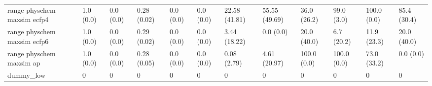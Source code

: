 \begin{tabular}{llllllllllll}
range physchem maxsim ecfp4 & {\cellcolor[HTML]{F6FCFD}} \color[HTML]{000000} 1.0 (0.0) & {\cellcolor[HTML]{F7FCFD}} \color[HTML]{000000} 0.0 (0.0) & {\cellcolor[HTML]{6FC6AA}} \color[HTML]{000000} 0.28 (0.02) & {\cellcolor[HTML]{F7FCFD}} \color[HTML]{000000} 0.0 (0.0) & {\cellcolor[HTML]{F7FCFD}} \color[HTML]{000000} 0.0 (0.0) & {\cellcolor[HTML]{D1EEEA}} \color[HTML]{000000} 22.58 (41.81) & {\cellcolor[HTML]{55B98F}} \color[HTML]{F1F1F1} 55.55 (49.69) & {\cellcolor[HTML]{00441B}} \color[HTML]{F1F1F1} 36.0 (26.2) & {\cellcolor[HTML]{00441B}} \color[HTML]{F1F1F1} 99.0 (3.0) & {\cellcolor[HTML]{28914D}} \color[HTML]{F1F1F1} 100.0 (0.0) & {\cellcolor[HTML]{F7FCFD}} \color[HTML]{000000} 85.4 (30.4) \\
range physchem maxsim ecfp6 & {\cellcolor[HTML]{F6FCFD}} \color[HTML]{000000} 1.0 (0.0) & {\cellcolor[HTML]{F7FCFD}} \color[HTML]{000000} 0.0 (0.0) & {\cellcolor[HTML]{6DC5A9}} \color[HTML]{000000} 0.29 (0.02) & {\cellcolor[HTML]{F7FCFD}} \color[HTML]{000000} 0.0 (0.0) & {\cellcolor[HTML]{F7FCFD}} \color[HTML]{000000} 0.0 (0.0) & {\cellcolor[HTML]{F2FAFC}} \color[HTML]{000000} 3.44 (18.22) & {\cellcolor[HTML]{F7FCFD}} \color[HTML]{000000} 0.0 (0.0) & {\cellcolor[HTML]{00441B}} \color[HTML]{F1F1F1} 20.0 (40.0) & {\cellcolor[HTML]{00441B}} \color[HTML]{F1F1F1} 6.7 (20.2) & {\cellcolor[HTML]{00491D}} \color[HTML]{F1F1F1} 11.9 (23.3) & {\cellcolor[HTML]{F7FCFD}} \color[HTML]{000000} 20.0 (40.0) \\
range physchem maxsim ap & {\cellcolor[HTML]{F6FCFD}} \color[HTML]{000000} 1.0 (0.0) & {\cellcolor[HTML]{F7FCFD}} \color[HTML]{000000} 0.0 (0.0) & {\cellcolor[HTML]{68C3A6}} \color[HTML]{000000} 0.28 (0.05) & {\cellcolor[HTML]{F7FCFD}} \color[HTML]{000000} 0.0 (0.0) & {\cellcolor[HTML]{F7FCFD}} \color[HTML]{000000} 0.0 (0.0) & {\cellcolor[HTML]{F7FCFD}} \color[HTML]{000000} 0.08 (2.79) & {\cellcolor[HTML]{F1FAFC}} \color[HTML]{000000} 4.61 (20.97) & {\cellcolor[HTML]{00441B}} \color[HTML]{F1F1F1} 100.0 (0.0) & {\cellcolor[HTML]{00441B}} \color[HTML]{F1F1F1} 100.0 (0.0) & {\cellcolor[HTML]{0C7735}} \color[HTML]{F1F1F1} 73.0 (33.2) & {\cellcolor[HTML]{F7FCFD}} \color[HTML]{000000} 0.0 (0.0) \\
dummy_low & {\cellcolor[HTML]{F7FCFD}} \color[HTML]{000000} 0 & {\cellcolor[HTML]{F7FCFD}} \color[HTML]{000000} 0 & {\cellcolor[HTML]{F7FCFD}} \color[HTML]{000000} 0 & {\cellcolor[HTML]{F7FCFD}} \color[HTML]{000000} 0 & {\cellcolor[HTML]{F7FCFD}} \color[HTML]{000000} 0 & {\cellcolor[HTML]{F7FCFD}} \color[HTML]{000000} 0 & {\cellcolor[HTML]{F7FCFD}} \color[HTML]{000000} 0 & {\cellcolor[HTML]{F7FCFD}} \color[HTML]{000000} 0 & {\cellcolor[HTML]{F7FCFD}} \color[HTML]{000000} 0 & {\cellcolor[HTML]{F7FCFD}} \color[HTML]{000000} 0 & {\cellcolor[HTML]{F7FCFD}} \color[HTML]{000000} 0 \\

\end{tabular}
